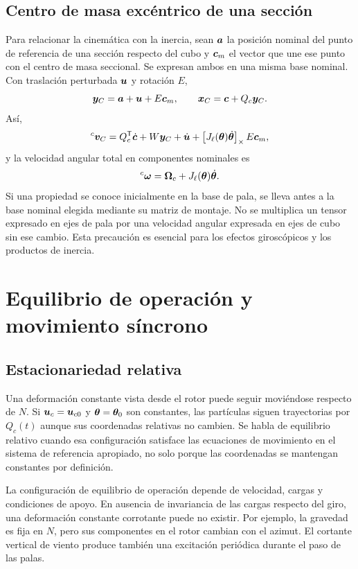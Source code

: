\subsection{Centro de masa excéntrico de una sección}
Para relacionar la cinemática con la inercia, sean $\bm{a}$ la posición nominal del punto de referencia de una sección respecto del cubo y $\bm{c}_m$ el vector que une ese punto con el centro de masa seccional. Se expresan ambos en una misma base nominal. Con traslación perturbada $\bm{u}$ y rotación $E$,
\begin{equation}
 \bm{y}_C=\bm{a}+\bm{u}+E\bm{c}_m,
 \qquad \bm{x}_C=\bm{c}+Q_c\bm{y}_C.
\end{equation}
Así,
\begin{equation}
 {}^c\bm{v}_C=Q_c^\mathsf T\dot{\bm{c}}+W\bm{y}_C+\dot{\bm{u}}
 +\left[J_\ell(\bm{\theta})\dot{\bm{\theta}}\right]_\times E\bm{c}_m,
 \label{eq:vgfull}
\end{equation}
y la velocidad angular total en componentes nominales es
\begin{equation}
 {}^c\bm{\omega}=\bm{\Omega}_c+J_\ell(\bm{\theta})\dot{\bm{\theta}}.
\end{equation}
Si una propiedad se conoce inicialmente en la base de pala, se lleva antes a la base nominal elegida mediante su matriz de montaje. No se multiplica un tensor expresado en ejes de pala por una velocidad angular expresada en ejes de cubo sin ese cambio. Esta precaución es esencial para los efectos giroscópicos y los productos de inercia.

\section{Equilibrio de operación y movimiento síncrono}
\subsection{Estacionariedad relativa}
Una deformación constante vista desde el rotor puede seguir moviéndose respecto de $N$. Si $\bm{u}_c=\bm{u}_{c0}$ y $\bm{\theta}=\bm{\theta}_0$ son constantes, las partículas siguen trayectorias por $Q_c(t)$ aunque sus coordenadas relativas no cambien. Se habla de equilibrio relativo cuando esa configuración satisface las ecuaciones de movimiento en el sistema de referencia apropiado, no solo porque las coordenadas se mantengan constantes por definición.

La configuración de equilibrio de operación depende de velocidad, cargas y condiciones de apoyo. En ausencia de invariancia de las cargas respecto del giro, una deformación constante corrotante puede no existir. Por ejemplo, la gravedad es fija en $N$, pero sus componentes en el rotor cambian con el azimut. El cortante vertical de viento produce también una excitación periódica durante el paso de las palas.

